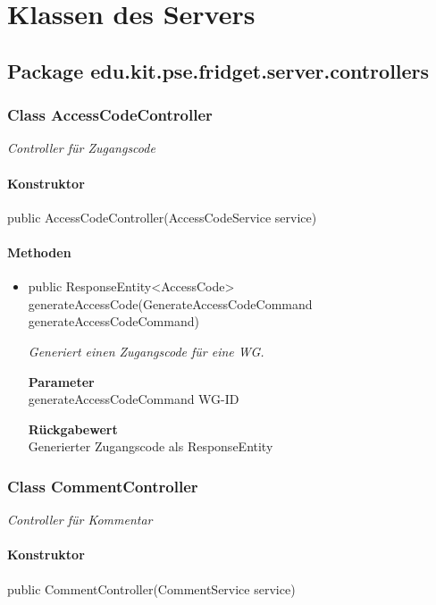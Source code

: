 \documentclass[a4paper]{scrreprt}
\begin{document}
    \chapter{Klassen des Servers}
        \section{Package edu.kit.pse.fridget.server.controllers}
        \subsection{Class AccessCodeController}
        \textit{Controller für Zugangscode}
        \subsubsection{Konstruktor}
        public AccessCodeController(AccessCodeService service)
        \subsubsection{Methoden}
        \begin{itemize}
        	\item{public ResponseEntity<AccessCode> generateAccessCode(GenerateAccessCodeCommand generateAccessCodeCommand)}
        	
        	\textit{Generiert einen Zugangscode für eine WG.}
        	
        	\textbf{Parameter} \\
        	generateAccessCodeCommand WG-ID
        	
        	\textbf{Rückgabewert} \\
        	Generierter Zugangscode als ResponseEntity
        \end{itemize}
        \subsection{Class CommentController}
        \textit{Controller für Kommentar}
        \subsubsection{Konstruktor}
        public CommentController(CommentService service)
\end{document}
